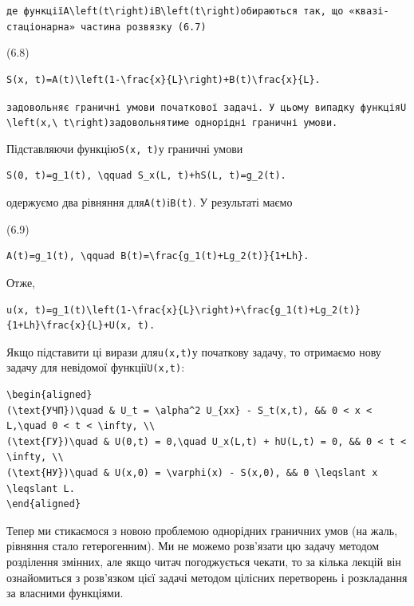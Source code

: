 \documentclass[
  ukrainian,
]{article}
\begin{document}
\texttt{де\ функції\textquotesingle{}A\textbackslash{}left(t\textbackslash{}right)\textquotesingle{}і\textquotesingle{}B\textbackslash{}left(t\textbackslash{}right)\textquotesingle{}обираються\ так,\ що\ «квазі-стаціонарна»\ частина\ розв\textquotesingle{}язку\ (6.7)}

(6.8)

\begin{verbatim}
S(x, t)=A(t)\left(1-\frac{x}{L}\right)+B(t)\frac{x}{L}.
\end{verbatim}

\texttt{задовольняє\ граничні\ умови\ початкової\ задачі.\ У\ цьому\ випадку\ функція\textquotesingle{}U\textbackslash{}left(x,\textbackslash{}\ t\textbackslash{}right)\textquotesingle{}задовольнятиме\ однорідні\ граничні\ умови.}

Підставляючи функцію\texttt{S(x,\ t)}у граничні умови

\begin{verbatim}
S(0, t)=g_1(t), \qquad S_x(L, t)+hS(L, t)=g_2(t).
\end{verbatim}

одержуємо два рівняння для\texttt{A(t)}і\texttt{B(t)}. У результаті
маємо

(6.9)

\begin{verbatim}
A(t)=g_1(t), \qquad B(t)=\frac{g_1(t)+Lg_2(t)}{1+Lh}.
\end{verbatim}

Отже,

\begin{verbatim}
u(x, t)=g_1(t)\left(1-\frac{x}{L}\right)+\frac{g_1(t)+Lg_2(t)}{1+Lh}\frac{x}{L}+U(x, t).
\end{verbatim}

Якщо підставити ці вирази для\texttt{u(x,t)}у початкову задачу, то
отримаємо нову задачу для невідомої функції\texttt{U(x,t)}:

\begin{verbatim}
\begin{aligned}
(\text{УЧП})\quad & U_t = \alpha^2 U_{xx} - S_t(x,t), && 0 < x < L,\quad 0 < t < \infty, \\
(\text{ГУ})\quad & U(0,t) = 0,\quad U_x(L,t) + hU(L,t) = 0, && 0 < t < \infty, \\
(\text{НУ})\quad & U(x,0) = \varphi(x) - S(x,0), && 0 \leqslant x \leqslant L.
\end{aligned}
\end{verbatim}

Тепер ми стикаємося з новою проблемою однорідних граничних умов (на
жаль, рівняння стало гетерогенним). Ми не можемо розв'язати цю задачу
методом розділення змінних, але якщо читач погоджується чекати, то за
кілька лекцій він ознайомиться з розв'язком цієї задачі методом цілісних
перетворень і розкладання за власними функціями.
\end{document}
